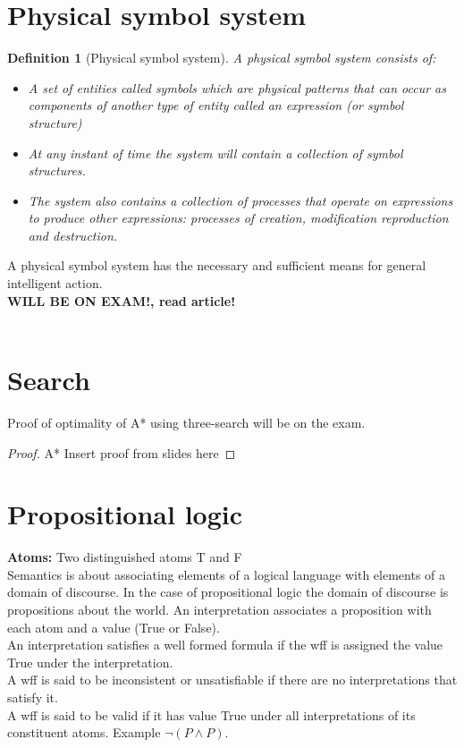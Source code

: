 \documentclass[a4paper]{article}
\newtheorem{definition}{Definition}[section]
\begin{document}
\section{Physical symbol system}
\begin{definition}[Physical symbol system]
  A physical symbol system consists of:
  \begin{itemize}
    \item A set of entities called symbols which are physical patterns that can
      occur as components of another type of entity called an expression (or
      symbol structure)
    \item At any instant of time the system will contain a collection of symbol
      structures.
    \item The system also contains a collection of processes that operate on
      expressions to produce other expressions: processes of creation,
      modification reproduction and destruction.
  \end{itemize}
  
\end{definition}
A physical symbol system has the necessary and sufficient means for general
intelligent action.
\\
\textbf{WILL BE ON EXAM!, read article!}
\\
\\

\section{Search}

Proof of optimality of A* using three-search will be on the exam.

\begin{proof}{A*}
  Insert proof from slides here
\end{proof} 



\section{Propositional logic}
\textbf{Atoms:} Two distinguished atoms T and F\\
Semantics is about associating elements of a logical language with elements of a
domain of discourse. In the case of propositional logic the domain of discourse
is propositions about the world. An interpretation associates a proposition with
each atom and a value (True or False).\\
An interpretation satisfies a well formed formula if the wff is assigned the
value True under the interpretation.\\
A wff is said to be inconsistent or unsatisfiable if there are no
interpretations that satisfy it.\\
A wff is said to be valid if it has value True under all interpretations of its
  constituent atoms. Example $\lnot (P \land P)$.\\
\end{document}
